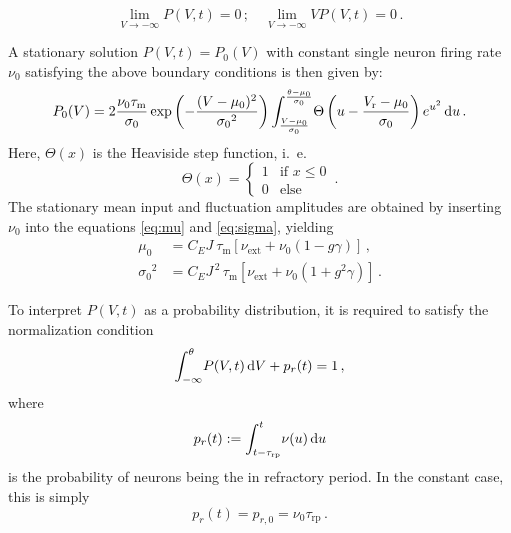 \begin{equation}
\lim_{V \to -\infty} P(V, t) = 0 \, ;
    \quad 
    \lim_{V \to -\infty} V P(V, t) = 0 \,.
\end{equation}

A stationary solution $P(V, t) = P_0(V)$ with constant 
single neuron firing rate $\nu_0$ 
satisfying the above boundary conditions is then given by:
\begin{equation}
    P_0(V) = 2 \frac{\nu_0 \tau_\text{m}}{\sigma_0} 
        \exp{\left(- \frac{(V - \mu_0)^2}{{\sigma_0}^2} \right)}
        \int_{\frac{V - \mu_0}{\sigma_0}}^{\frac{\theta - \mu_0}{\sigma_0}} \! 
            \Theta \left(u - \frac{V_\text{r} - \mu_0}{\sigma_0} \right) e^{u^2} \mathop{}\!\text{d} u  \,. 
    \label{eq:P_V_0}
\end{equation}
Here, $\Theta(x)$ is the Heaviside step function, i.~e. 
\begin{equation}
    \Theta(x) = \begin{cases} 1 & \text{if } x \le 0 \\ 0 & \text{else } \end{cases}  \,.
    \label{eq:heaviside}
\end{equation}
The stationary mean input and fluctuation amplitudes are obtained by inserting 
$\nu_0$ into the equations \eqref{eq:mu} and \eqref{eq:sigma}, yielding 
\begin{align}
    \mu_0 	    &= C_E J \:\tau_\text{m} [\nu_\text{ext} + \nu_0(1 - g \gamma)]  \,, \\ 
    {\sigma_0}^2 	&= C_E J^{\,2} \,\tau_\text{m} [\nu_\text{ext} + \nu_0(1 + g^2 \gamma)] \,.
    \label{eq:mu_sigma_0}
\end{align}

To interpret $P(V, t)$ as a probability distribution, it is required to
satisfy the normalization condition
\begin{equation}
    \int_{-\infty}^{\theta} \! P(V, t) \mathop{}\!\text{d} V  + p_r(t) = 1 \, ,
    \label{eq:P_V_prob}
\end{equation}
where 
\begin{equation}
    p_r(t) := \int_{t - \tau_\text{rp}}^{t} \! \nu(u) \mathop{}\!\text{d} u 
    \label{eq:p_r}
\end{equation}
is the probability of neurons being the in refractory period.
In the constant case, this is simply 
\begin{equation}
    p_r(t) = p_{r, 0} = \nu_0 \tau_\text{rp}  \,.
    \label{eq:p_r_0}
\end{equation}

